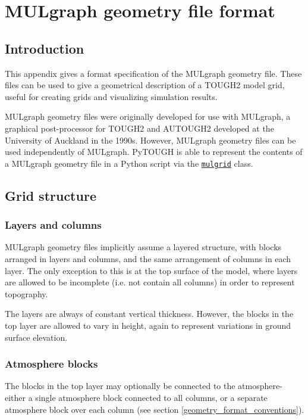 \chapter{MULgraph geometry file format}
\label{geometry_file_format}

\section{Introduction}
This appendix gives a format specification of the MULgraph geometry file. These files can be used to give a geometrical description of a TOUGH2 model grid, useful for creating grids and visualizing simulation results.

MULgraph geometry files were originally developed for use with MULgraph, a graphical post-processor for TOUGH2 and AUTOUGH2 \citep{mulgraph} developed at the University of Auckland in the 1990s. However, MULgraph geometry files can be used independently of MULgraph. PyTOUGH is able to represent the contents of a MULgraph geometry file in a Python script via the \hyperref[mulgrids]{\texttt{mulgrid}} class.

\section{Grid structure}

\subsection{Layers and columns}
MULgraph geometry files implicitly assume a layered structure, with blocks arranged in layers and columns, and the same arrangement of columns in each layer. The only exception to this is at the top surface of the model, where layers are allowed to be incomplete (i.e. not contain all columns) in order to represent topography.

The layers are always of constant vertical thickness. However, the blocks in the top layer are allowed to vary in height, again to represent variations in ground surface elevation.

\subsection{Atmosphere blocks}
The blocks in the top layer may optionally be connected to the atmosphere- either a single atmosphere block connected to all columns, or a separate atmosphere block over each column (see section \ref{geometry_format_conventions}).

